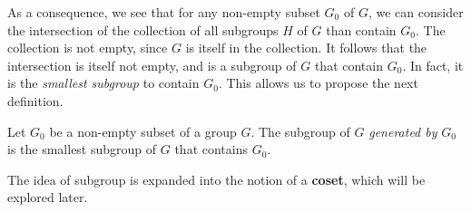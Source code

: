 \documentclass[main.tex]{subfiles}
\begin{document}
			As a consequence, we see that for any non-empty subset $G_0$ of $G$, we can consider the intersection of the collection of all subgroups $H$ of $G$ than contain $G_0$. The collection is not empty, since $G$ is itself in the collection. It follows that the intersection is itself not empty, and is a subgroup of $G$ that contain $G_0$. In fact, it is the \textit{smallest subgroup} to contain $G_0$. This allows us to propose the next definition.
			
			\begin{definition}
				Let $G_0$ be a non-empty subset of a group $G$. The subgroup of $G$ \textit{generated by} $G_0$ is the smallest subgroup of $G$ that contains $G_0$.
			\end{definition}
			
			The idea of subgroup is expanded into the notion of a \textbf{coset}, which will be explored later.
			
\end{document}
